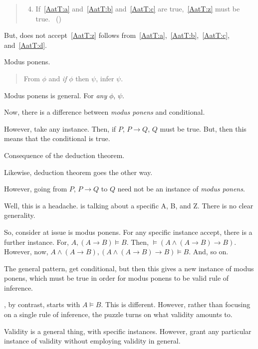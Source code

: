 \begin{note}
  \begin{quote}
    \begin{enumerate}[label=(\emph{\Alph*}), ref=\emph{\Alph*}]
      \setcounter{enumi}{3}
    \item
      \label{AatT:d}
      If~\ref{AatT:a} and~\ref{AatT:b} and~\ref{AatT:c} are true,~\ref{AatT:z} must be true.%
      \mbox{ }\hfill\mbox{(\citeyear[279]{Carroll:1895uj})}
    \end{enumerate}
  \end{quote}

  But, does not accept~\ref{AatT:z} follows from~\ref{AatT:a},~\ref{AatT:b},~\ref{AatT:c}, and~\ref{AatT:d}.
\end{note}

\begin{note}
  Modus ponens.

  \begin{quote}
    From \(\phi\) and \emph{if} \(\phi\) then \(\psi\), infer \(\psi\).
  \end{quote}

  Modus ponens is general.
  For \emph{any} \(\phi\), \(\psi\).

  Now, there is a difference between \emph{modus ponens} and conditional.

  However, take any instance.
  Then, if \(P\), \(P \rightarrow Q\), \(Q\) must be true.
  But, then this means that the conditional is true.

  Consequence of the deduction theorem.

  Likewise, deduction theorem goes the other way.

  However, going from \(P\), \(P \rightarrow Q\) to \(Q\) need not be an instance of \emph{modus ponens}.
\end{note}

\begin{note}
  Well, this is a headache.
  \citeauthor{Carroll:1895uj} is talking about a specific A, B, and Z.
  There is no clear generality.
\end{note}

\begin{note}
  So, consider at issue is modus ponens.
  For any specific instance accept, there is a further instance.
  For, \(A, (A \rightarrow B) \vDash B\).
  Then, \(\vDash (A \land (A \rightarrow B) \rightarrow B)\).
  However, now, \(A \land (A \rightarrow B), (A \land (A \rightarrow B) \rightarrow B) \vDash B\).
  And, so on.

  The general pattern, get conditional, but then this gives a new instance of modus ponens, which must be true in order for modus ponens to be valid rule of inference.

  \citeauthor{Carroll:1895uj}, by contrast, starts with \(A \vDash B\).
  This is different.
  However, rather than focusing on a single rule of inference, the puzzle turns on what validity amounts to.

  Validity is a general thing, with specific instances.
  However, grant any particular instance of validity without employing validity in general.
\end{note}

